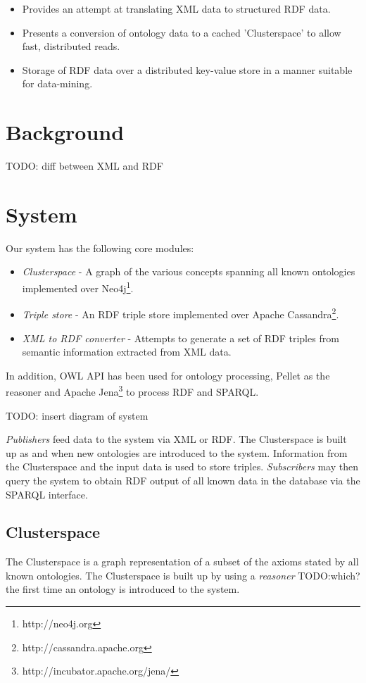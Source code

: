 \documentclass[conference]{IEEEtran}
\begin{document}
\begin{itemize}
    \item Provides an attempt at translating XML data to structured RDF data.
    \item Presents a conversion of ontology data to a cached 'Clusterspace' to
        allow fast, distributed reads.
    \item Storage of RDF data over a distributed key-value store in a manner
        suitable for data-mining.
\end{itemize}

\section{Background}
\label{sec:background}


TODO: diff between XML and RDF

\section{System}
Our system has the following core modules:

\begin{itemize}
    \item \emph{Clusterspace} - A graph of the various concepts spanning all
        known ontologies implemented over Neo4j\footnote{http://neo4j.org}.
    \item \emph{Triple store} - An RDF triple store implemented over Apache
        Cassandra\footnote{http://cassandra.apache.org}.
    \item \emph{XML to RDF converter} - Attempts to generate a set of RDF
        triples from semantic information extracted from XML data.
\end{itemize}

In addition, OWL API\cite{Hor:09} has been used for ontology processing,
Pellet\cite{Parsia04pellet:an} as the reasoner and Apache
Jena\footnote{http://incubator.apache.org/jena/} to process RDF and SPARQL.

TODO: insert diagram of system

\emph{Publishers} feed data to the system via XML or RDF. The Clusterspace is
built up as and when new ontologies are introduced to the system. Information
from the Clusterspace and the input data is used to store triples.
\emph{Subscribers} may then query the system to obtain RDF output of all known
data in the database via the SPARQL interface.

\subsection{Clusterspace}
The Clusterspace is a graph representation of a subset of the axioms stated by
all known ontologies. The Clusterspace is built up by using a \emph{reasoner}
TODO:which? the first time an ontology is introduced to the system. 
\end{document}
